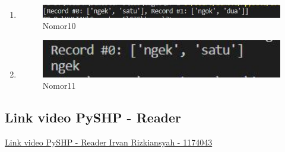 \begin{enumerate}
			\item 
				
				\begin{figure}[H]
					\includegraphics[width=12cm]{figures/1174043/TUGAS3/10.jpg}
					\centering
					\caption{Nomor10}
				\end{figure}
			
			\item 
				
				\begin{figure}[H]
					\includegraphics[width=12cm]{figures/1174043/TUGAS3/11.jpg}
					\centering
					\caption{Nomor11}
				\end{figure}
		\end{enumerate}
		
	\subsection{Link video PySHP - Reader}
		\href{https://youtu.be/EcAkAj2mTq8} {Link video PySHP - Reader Irvan Rizkiansyah - 1174043}